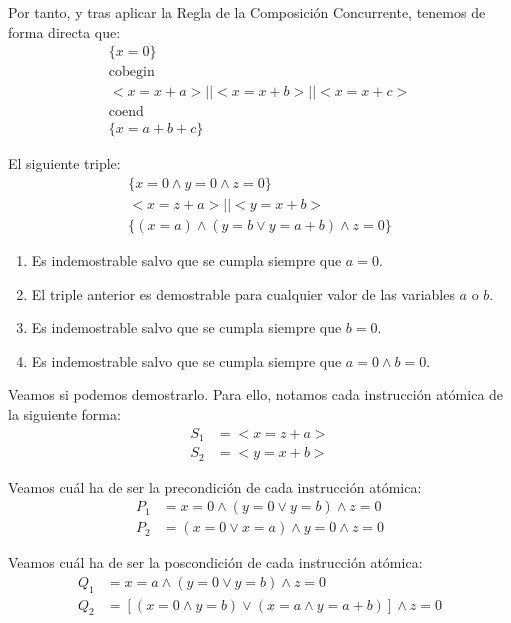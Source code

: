 \begin{ejercicio}
Por tanto, y tras aplicar la Regla de la Composición Concurrente, tenemos de forma directa que:
    \begin{gather*}
        \{x = 0\} \\
        \text{cobegin} \\
        <x = x + a> || <x = x + b> || <x = x + c> \\
        \text{coend} \\
        \{x = a + b + c\}
    \end{gather*}
\end{ejercicio}

\begin{ejercicio}
    El siguiente triple:
    \begin{gather*}
        \{x=0 \land y = 0 \land z = 0\} \\
        <x = z + a> || <y = x+b> \\
        \{(x = a) \land (y = b \lor y = a +b) \land z = 0\}
    \end{gather*}
    \begin{enumerate}[label=(\alph*)]
        \item Es indemostrable salvo que se cumpla siempre que $a=0$.
        \item El triple anterior es demostrable para cualquier valor de las variables $a$ o $b$.
        \item Es indemostrable salvo que se cumpla siempre que $b = 0$.
        \item Es indemostrable salvo que se cumpla siempre que $a = 0 \land b = 0$.
    \end{enumerate}

    Veamos si podemos demostrarlo. Para ello, notamos cada instrucción atómica de la siguiente forma:
    \begin{align*}
        S_1 &= <x = z + a> \\
        S_2 &= <y = x + b>
    \end{align*}

    Veamos cuál ha de ser la precondición de cada instrucción atómica:
    \begin{align*}
        P_1 &= x=0 \land (y=0 \lor y=b) \land z=0 \\
        P_2 &= (x=0\lor x=a) \land y=0 \land z=0
    \end{align*}

    Veamos cuál ha de ser la poscondición de cada instrucción atómica:
    \begin{align*}
        Q_1 &= x=a\land (y=0 \lor y=b)\land z=0 \\
        Q_2 &= [(x=0\land y=b) \lor (x=a\land y=a+b)] \land z=0
    \end{align*}


\end{ejercicio}
